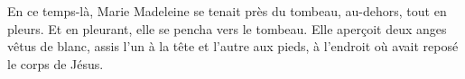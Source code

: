 En ce temps-là, Marie Madeleine se tenait près du tombeau,
	au-dehors, tout en pleurs.
Et en pleurant, elle se pencha vers le tombeau.
Elle aperçoit deux anges vêtus de blanc,
	assis l’un à la tête et l’autre aux pieds,
	à l’endroit où avait reposé le corps de Jésus.
